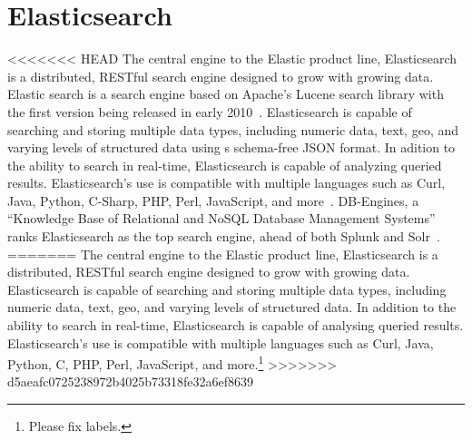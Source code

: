 \section{Elasticsearch}

<<<<<<< HEAD
The central engine to the Elastic product line, Elasticsearch is a
distributed, RESTful search engine designed to grow with growing
data. Elastic search is a search engine based on Apache's Lucene
search library with the first version being released in early
2010~\cite{hid-sp18-507-ElasticWiki}. Elasticsearch is capable of
searching and storing multiple data types, including numeric data,
text, geo, and varying levels of structured data using s schema-free
JSON format. In adition to the ability to search in real-time,
Elasticsearch is capable of analyzing queried results. Elasticsearch's
use is compatible with multiple languages such as Curl, Java, Python,
C-Sharp, PHP, Perl, JavaScript, and
more~\cite{hid-sp18-507-Elasticsearch}. DB-Engines, a ``Knowledge Base
of Relational and NoSQL Database Management Systems'' ranks
Elasticsearch as the top search engine, ahead of both Splunk and
Solr~\cite{hid-sp18-507-DBEngines}.
=======
The central engine to the Elastic product line, Elasticsearch is a distributed,
RESTful search engine designed to grow with growing data. Elasticsearch is
capable of searching and storing multiple data types, including numeric data,
text, geo, and varying levels of structured data. In addition to the ability to
search in real-time, Elasticsearch is capable of analysing queried
results. Elasticsearch's use is compatible with multiple languages such as Curl,
Java, Python, C, PHP, Perl, JavaScript, and more\cite{Elasticsearch}.\footnote{Please fix labels.}
>>>>>>> d5aeafc0725238972b4025b73318fe32a6ef8639
